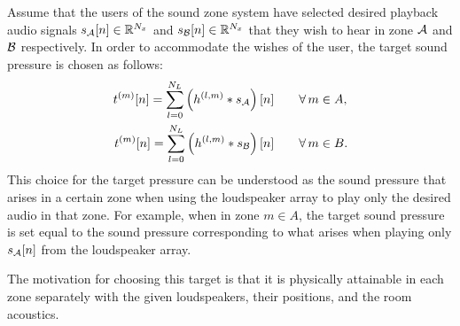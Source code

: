 Assume that the users of the sound zone system have selected desired playback audio signals $s_{\mathcal{A}}[n]\in\mathbb{R}^{N_x}$ and
$s_{\mathcal{B}}[n]\in\mathbb{R}^{N_x}$ that they wish to hear in zone $\mathcal{A}$ and $\mathcal{B}$ respectively.
In order to accommodate the wishes of the user, the target sound pressure is chosen as follows: 
\begin{align}
    \begin{aligned}
        t^{(m)}[n] = \sum_{l=0}^{N_L} \left(h^{(l,m)} \ast s_{\mathcal{A}}\right)[n]\qquad &\forall\,m\in A,\\
        t^{(m)}[n] = \sum_{l=0}^{N_L} \left(h^{(l,m)} \ast s_{\mathcal{B}}\right)[n]\qquad &\forall\,m\in B.
    \end{aligned}
    \label{eq:sound_zone:data_model:target_pressure}
\end{align}
This choice for the target pressure can be understood as the sound pressure that arises in a certain zone
when using the loudspeaker array to play only the desired audio in that zone. 
For example, when in zone $m\in A$, the target sound pressure is set equal to the sound pressure corresponding to 
what arises when playing only $s_{\mathcal{A}}[n]$ from the loudspeaker array.

The motivation for choosing this target is that it is physically attainable in each zone separately
with the given loudspeakers, their positions, and the room acoustics.
